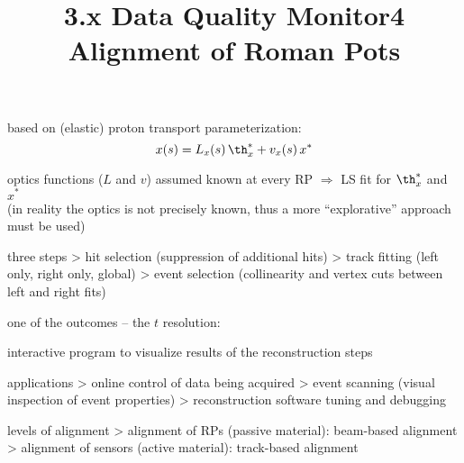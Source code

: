 \> based on (elastic) proton transport parameterization:
$$x(s) = L_x(s)\,\th_x^* + v_x(s)\,x^*$$

\> optics functions ($L$ and $v$) assumed known at every RP $\Rightarrow$ LS fit for $\th_x^*$ and $x^*$\\
(in reality the optics is not precisely known, thus a more ``explorative'' approach must be used)

\> three steps
\>> hit selection (suppression of additional hits)
\>> track fitting (left only, right only, global)
\>> event selection (collinearity and vertex cuts between left and right fits)

\> one of the outcomes -- the $t$ resolution:



\newpage%
\title{3.x Data Quality Monitor}


\> interactive program to visualize results of the reconstruction steps

\> applications
\>> online control of data being acquired
\>> event scanning (visual inspection of event properties)
\>> reconstruction software tuning and debugging



\newpage%
\title{4 Alignment of Roman Pots}


\vfil

 levels of alignment
\>> alignment of RPs (passive material): beam-based alignment
\>> alignment of sensors (active material): track-based alignment 

